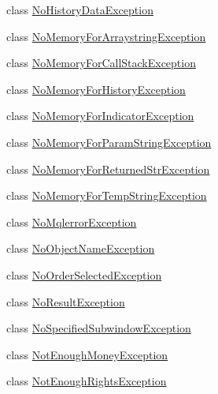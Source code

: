 \begin{DoxyCompactItemize}
\item 
class \hyperlink{class_m_q_l4_c_sharp_1_1_base_1_1_exceptions_1_1_no_history_data_exception}{No\+History\+Data\+Exception}
\item 
class \hyperlink{class_m_q_l4_c_sharp_1_1_base_1_1_exceptions_1_1_no_memory_for_arraystring_exception}{No\+Memory\+For\+Arraystring\+Exception}
\item 
class \hyperlink{class_m_q_l4_c_sharp_1_1_base_1_1_exceptions_1_1_no_memory_for_call_stack_exception}{No\+Memory\+For\+Call\+Stack\+Exception}
\item 
class \hyperlink{class_m_q_l4_c_sharp_1_1_base_1_1_exceptions_1_1_no_memory_for_history_exception}{No\+Memory\+For\+History\+Exception}
\item 
class \hyperlink{class_m_q_l4_c_sharp_1_1_base_1_1_exceptions_1_1_no_memory_for_indicator_exception}{No\+Memory\+For\+Indicator\+Exception}
\item 
class \hyperlink{class_m_q_l4_c_sharp_1_1_base_1_1_exceptions_1_1_no_memory_for_param_string_exception}{No\+Memory\+For\+Param\+String\+Exception}
\item 
class \hyperlink{class_m_q_l4_c_sharp_1_1_base_1_1_exceptions_1_1_no_memory_for_returned_str_exception}{No\+Memory\+For\+Returned\+Str\+Exception}
\item 
class \hyperlink{class_m_q_l4_c_sharp_1_1_base_1_1_exceptions_1_1_no_memory_for_temp_string_exception}{No\+Memory\+For\+Temp\+String\+Exception}
\item 
class \hyperlink{class_m_q_l4_c_sharp_1_1_base_1_1_exceptions_1_1_no_mqlerror_exception}{No\+Mqlerror\+Exception}
\item 
class \hyperlink{class_m_q_l4_c_sharp_1_1_base_1_1_exceptions_1_1_no_object_name_exception}{No\+Object\+Name\+Exception}
\item 
class \hyperlink{class_m_q_l4_c_sharp_1_1_base_1_1_exceptions_1_1_no_order_selected_exception}{No\+Order\+Selected\+Exception}
\item 
class \hyperlink{class_m_q_l4_c_sharp_1_1_base_1_1_exceptions_1_1_no_result_exception}{No\+Result\+Exception}
\item 
class \hyperlink{class_m_q_l4_c_sharp_1_1_base_1_1_exceptions_1_1_no_specified_subwindow_exception}{No\+Specified\+Subwindow\+Exception}
\item 
class \hyperlink{class_m_q_l4_c_sharp_1_1_base_1_1_exceptions_1_1_not_enough_money_exception}{Not\+Enough\+Money\+Exception}
\item 
class \hyperlink{class_m_q_l4_c_sharp_1_1_base_1_1_exceptions_1_1_not_enough_rights_exception}{Not\+Enough\+Rights\+Exception}

\end{DoxyCompactItemize}
